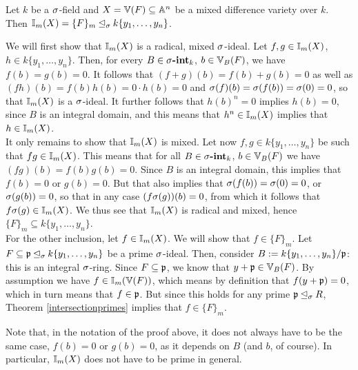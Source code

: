 \begin{prop}\label{I=F_m}
Let $k$ be a $\sigma$-field and $X = \mathbb{V}(F) \subseteq \mathbb{A}^n$ be a mixed difference variety over $k$. Then $\mathbb{I}_m(X) = \{F\}_m \unlhd_{\sigma} k\{y_1,\ldots,y_n\}$. 
\begin{bew}
We will first show that $\mathbb{I}_m(X)$ is a radical, mixed $\sigma$-ideal.
Let $f, g \in \mathbb{I}_m(X)$, $h \in k\{y_1,\ldots,y_n\}$. Then, for every $B \in \sigma\text{{\normalfont\textbf{-int}}}_k$, $b \in \mathbb{V}_B(F)$, we have $f(b) = g(b) = 0$.
It follows that $(f + g)(b) = f(b) + g(b) = 0$ as well as $(fh)(b) = f(b)h(b) = 0 \cdot h(b) = 0$ and $\sigma(f)(b) = \sigma(f(b)) = \sigma(0) = 0$, so that $\mathbb{I}_m(X)$ is a $\sigma$-ideal.
It further follows that $h(b)^n = 0$ implies $h(b) = 0$, since $B$ is an integral domain, and this means that $h^n \in \mathbb{I}_m(X)$ implies that $ h \in \mathbb{I}_m(X)$. \\
\indent It only remains to show that $\mathbb{I}_m(X)$ is mixed. Let now $f,g \in k\{y_1,\ldots,y_n\}$ be such that $fg \in \mathbb{I}_m(X)$. This means that for all  $B \in \sigma\text{{\normalfont\textbf{-int}}}_k$, $b \in \mathbb{V}_B(F)$ we have
 $(fg)(b) = f(b) g(b) = 0$. Since $B$ is an integral domain,
this implies that $f(b) = 0$ or $g(b) = 0$. But that also implies that $\sigma(f(b)) = \sigma(0) = 0$, or $\sigma(g(b)) = 0$, so that in any case $(f\sigma(g))(b) = 0$, from which it follows that $f\sigma(g) \in \mathbb{I}_m(X)$. We thus see that $\mathbb{I}_m(X)$ is radical and mixed, hence $\{F\}_m \subseteq k\{y_1,\ldots,y_n\}$. \\
\indent For the other inclusion, let $f \in \mathbb{I}_m(X)$. We will show that $f \in \{F\}_m$. Let $F \subseteq \mathfrak{p} \unlhd_{\sigma} k\{y_1,\ldots,y_n\}$ be a prime $\sigma$-ideal.
Then, consider $B:= k\{y_1,\ldots,y_n\}/\mathfrak{p}$: this is an integral $\sigma$-ring. Since $F \subseteq \mathfrak{p}$, we know that $y + \mathfrak{p} \in \mathbb{V}_B(F)$. By assumption we have $f \in \mathbb{I}_m(\mathbb{V}(F))$, which means by definition that $f(y + \mathfrak{p}) = 0$, which
in turn means that $f \in \mathfrak{p}$. But since this holds for any prime $\mathfrak{p} \unlhd_{\sigma} R$, Theorem \ref{intersectionprimes} implies that $f \in \{F\}_m$.
\end{bew}
\end{prop}
Note that, in the notation of the proof above,  it does not always have to be the same case, $f(b) = 0$ or $g(b) = 0$, as it depends on $B$ (and $b$, of course). In particular, $\mathbb{I}_m(X)$ does not have to be prime in general. \\

